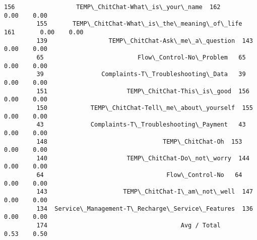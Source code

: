 \documentclass[11pt]{article}
\begin{document}
\begin{Verbatim}[commandchars=\\\{\}]
         156                 TEMP\_ChitChat-What\_is\_your\_name  162       0.00    0.00   
         155       TEMP\_ChitChat-What\_is\_the\_meaning\_of\_life  161       0.00    0.00   
         139                 TEMP\_ChitChat-Ask\_me\_a\_question  143       0.00    0.00   
         65                          Flow\_Control-No\_Problem   65       0.00    0.00   
         39                Complaints-T\_Troubleshooting\_Data   39       0.00    0.00   
         151                      TEMP\_ChitChat-This\_is\_good  156       0.00    0.00   
         150            TEMP\_ChitChat-Tell\_me\_about\_yourself  155       0.00    0.00   
         43             Complaints-T\_Troubleshooting\_Payment   43       0.00    0.00   
         148                                TEMP\_ChitChat-Oh  153       0.00    0.00   
         140                      TEMP\_ChitChat-Do\_not\_worry  144       0.00    0.00   
         64                                  Flow\_Control-No   64       0.00    0.00   
         143                     TEMP\_ChitChat-I\_am\_not\_well  147       0.00    0.00   
         134  Service\_Management-T\_Recharge\_Service\_Features  136       0.00    0.00   
         174                                     Avg / Total            0.53    0.50   
         

\end{Verbatim}
\end{document}
